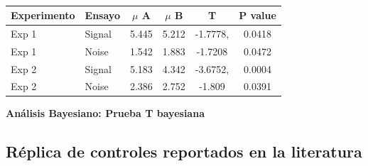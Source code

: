 \begin{table}
\caption[Prueba T para evaluar diferencias en las medias de los puntajes de confianza asigandos entre condiciones]{}
\label{Tabla_t-HitsyFA}
\centering
\begin{tabular}{l l |  c c c c}
\toprule
\textbf{Experimento} & \textbf{Ensayo} & \textbf{$\mu$ A} & \textbf{$\mu$ B} & \textbf{T} & \textbf{P value}\\
\midrule
Exp 1 & Signal & 5.445 & 5.212 & -1.7778, & 0.0418 \\
Exp 1 & Noise & 1.542 & 1.883 & -1.7208 & 0.0472 \\
Exp 2 & Signal & 5.183 & 4.342  & -3.6752, & 0.0004 \\
Exp 2 & Noise & 2.386 & 2.752 & -1.809 & 0.0391 \\
\bottomrule
\end{tabular}
\end{table}


\textbf{Análisis Bayesiano: Prueba T bayesiana }











\subsection{Réplica de controles reportados en la literatura}



